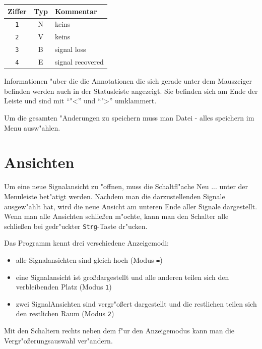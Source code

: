 \noindent
\begin{tabular}{c|c|l}
	\textbf{Ziffer} & \textbf{Typ} & \textbf{Kommentar} \\ \hline
	\verb|1| & N & keins \\
	\verb|2| & V & keins \\
	\verb|3| & B & signal loss\\
	\verb|4| & E & signal recovered\\
\end{tabular}

Informationen "uber die die Annotationen die sich gerade unter dem Mauszeiger befinden werden auch in der Statusleiste angezeigt.
Sie befinden sich am Ende der Leiste und sind mit "`"<"' und "`">"' umklammert.

Um die gesamten "Anderungen zu speichern muss man \textsf{Datei - alles speichern} im Menu ausw"ahlen.

\section{Ansichten}

Um eine neue Signalansicht zu "offnen, muss die Schaltfl"ache \textsf{Neu ...} unter der Menuleiste bet"atigt werden.
Nachdem man die darzustellenden Signale ausgew"ahlt hat, wird die neue Ansicht am unteren Ende aller Signale dargestellt.
Wenn man alle Ansichten schlie\ss en m"ochte, kann man den Schalter \textsf{alle schlie\ss en} bei gedr"uckter \verb|Strg|-Taste dr"ucken.

Das Programm kennt drei verschiedene Anzeigemodi:
\begin{itemize}
	\item alle Signalansichten sind gleich hoch (Modus \verb|=|)
	\item eine Signalansicht ist gro\ss dargestellt und alle anderen teilen sich den verbleibenden Platz (Modus \verb|1|)
	\item zwei SignalAnsichten sind vergr"o\ss ert dargestellt und die restlichen teilen sich den restlichen Raum (Modus \verb|2|)
\end{itemize}
Mit den Schaltern rechts neben dem f"ur den Anzeigemodus kann man die Vergr"o\ss erungsauswahl ver"andern.
